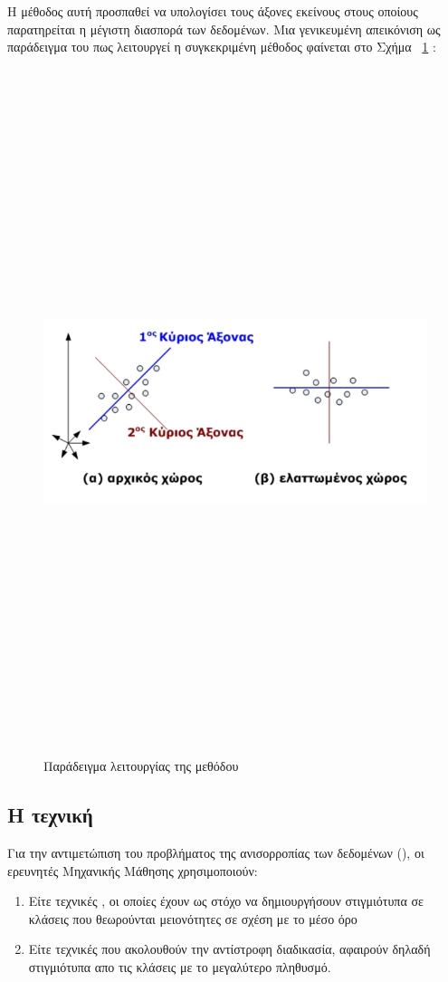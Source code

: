 Η μέθοδος αυτή προσπαθεί να υπολογίσει τους άξονες εκείνους στους οποίους παρατηρείται η μέγιστη διασπορά των δεδομένων.
Μια γενικευμένη απεικόνιση ως παράδειγμα του πως λειτουργεί η συγκεκριμένη μέθοδος φαίνεται στο Σχήμα~ \ref{figure5.2} :
\clearpage
\begin{figure} [ht!]
\centering
\includegraphics[width=\textwidth,height=20cm,keepaspectratio]{pictures/5.2pca.png} 
\caption{Παράδειγμα λειτουργίας της μεθόδου }\label{figure5.2}
\end{figure}

\subsection{Η τεχνική }

Για την αντιμετώπιση του προβλήματος της ανισορροπίας των δεδομένων (), οι ερευνητές Μηχανικής Μάθησης χρησιμοποιούν:
\begin{enumerate}
    \item Είτε τεχνικές , οι οποίες έχουν ως στόχο να δημιουργήσουν στιγμιότυπα σε κλάσεις που θεωρούνται μειονότητες σε σχέση με το μέσο όρο
    \item Είτε τεχνικές  που ακολουθούν την αντίστροφη διαδικασία, αφαιρούν δηλαδή στιγμιότυπα απο τις κλάσεις με το μεγαλύτερο πληθυσμό.
\end{enumerate}

